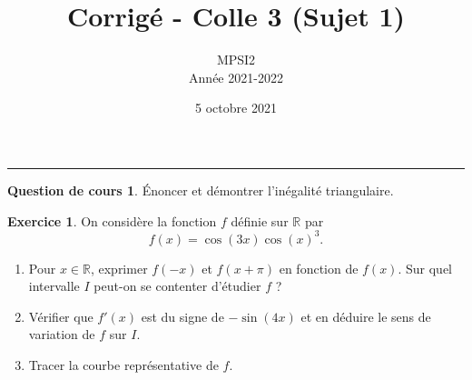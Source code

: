 \documentclass[a4paper, 11pt,openany]{article}%
\title{Corrigé - Colle 3 (Sujet 1)}
\author{MPSI2\\
Année 2021-2022}
\date{5 octobre 2021}
\theoremstyle{plain}
\theoremstyle{definition}
\newtheorem{cours}{Question de cours}
\newtheorem{exo}{Exercice}
\theoremstyle{remark}
\newcommand{\R}{\mathbb{R}}
\begin{document}
   \maketitle
      \rule{\linewidth}{0.5mm}

\begin{cours}
Énoncer et démontrer l'inégalité triangulaire.
\end{cours}

\begin{exo}
On considère la fonction $f$ définie sur $\R$ par
\[ f(x)=\cos(3x) \cos(x)^3.\]
\begin{enumerate}
\item Pour $x \in \R$, exprimer $f(-x)$ et $f(x + \pi)$ en fonction de $f(x)$. Sur quel intervalle $I$ peut-on se contenter d'étudier $f$ ?
\item Vérifier que $f'(x)$ est du signe de $-\sin(4x)$ et en déduire le sens de variation de $f$ sur $I$.
\item Tracer la courbe représentative de $f$.
\end{enumerate}
\end{exo}
\end{document}
